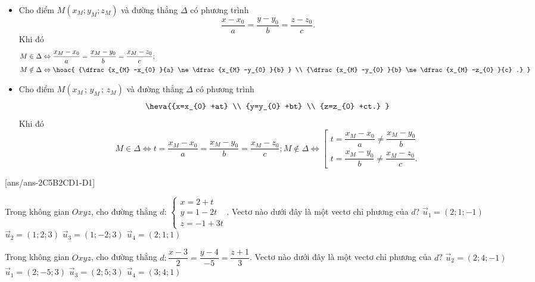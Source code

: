 \begin{itemize}
	\item  Cho điểm $M\left(x_{M} ; y_{M} ; z_{M} \right)$ và đường thẳng $\Delta $ có phương trình $$\dfrac{x-x_{0} }{a} =\dfrac{y-y_{0} }{b} =\dfrac{z-z_{0} }{c} .$$ Khi đó
	\begin{align*}
	M\in \Delta & \Leftrightarrow \dfrac{x_{M} -x_{0} }{a} =\dfrac{x_{M} -y_{0} }{b} =\dfrac{x_{M} -z_{0} }{c} ;\\
	 M\notin \Delta &\Leftrightarrow \hoac{ {\dfrac{x_{M} -x_{0} }{a} \ne \dfrac{x_{M} -y_{0} }{b} } \\ {\dfrac{x_{M} -y_{0} }{b} \ne \dfrac{x_{M} -z_{0} }{c} .} }
	\end{align*}
	\item  Cho điểm $M\left(x_{M} \, ;\, y_{M} \, ;\, z_{M} \right)$ và đường thẳng $\Delta $ có phương trình $$\heva{{x=x_{0} +at} \\ {y=y_{0} +bt} \\ {z=z_{0} +ct.} } $$ 
	Khi đó
\[M\in \Delta \Leftrightarrow t=\dfrac{x_{M} -x_{0} }{a} =\dfrac{x_{M} -y_{0} }{b} =\dfrac{x_{M} -z_{0} }{c} ;      M\notin \Delta \Leftrightarrow \left[\begin{array}{l} {t=\dfrac{x_{M} -x_{0} }{a} \ne \dfrac{x_{M} -y_{0} }{b} } \\ {t=\dfrac{x_{M} -y_{0} }{b} \ne \dfrac{x_{M} -z_{0} }{c} .} \end{array}\right. \]
\end{itemize}
\TN
{}[ans/ans-2C5B2CD1-D1]
\begin{ex}%
	Trong không gian $Oxyz$, cho đường thẳng $d$: $\left\{\begin{array}{c} {x=2+t} \\ {y=1-2t} \\ {z=-1+3t} \end{array}\right.$. Vectơ nào dưới đây là một vectơ chỉ phương của $d$?
	\choice
		{$\overrightarrow{u}_1=(2;1;-1)$}
		{$\overrightarrow{u}_2=(1;2;3)$}
		{\True $\overrightarrow{u}_3=(1;-2;3)$}
		{$\overrightarrow{u}_4=(2;1;1)$}
\end{ex}

\begin{ex}%
	Trong không gian $Oxyz$, cho đường thẳng $d:\dfrac{x-3}{2}=\dfrac{y-4}{-5}=\dfrac{z+1}{3}$. Vectơ nào dưới đây là một vectơ chỉ phương của $d$?
	\choice
		{$\overrightarrow{u}_2=\left(2;4;-1\right)$}
		{\True $\overrightarrow{u}_1=\left(2;-5;3\right)$}
		{$\overrightarrow{u}_3=\left(2;5;3\right)$}
		{$\overrightarrow{u}_4=\left(3;4;1\right)$}
\end{ex}

